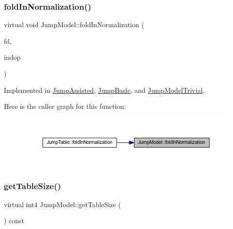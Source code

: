 \subsubsection{\texorpdfstring{foldInNormalization()}{foldInNormalization()}}
{\footnotesize\ttfamily virtual void Jump\+Model\+::fold\+In\+Normalization (\begin{DoxyParamCaption}\item[{\mbox{\hyperlink{class_funcdata}{Funcdata}} $\ast$}]{fd,  }\item[{\mbox{\hyperlink{class_pcode_op}{Pcode\+Op}} $\ast$}]{indop }\end{DoxyParamCaption})\hspace{0.3cm}{\ttfamily [pure virtual]}}



Implemented in \mbox{\hyperlink{class_jump_assisted_aa9732767f921501368f90bd0d1defa1a}{Jump\+Assisted}}, \mbox{\hyperlink{class_jump_basic_a4f3c7e75f6b89afd01e64950959e114d}{Jump\+Basic}}, and \mbox{\hyperlink{class_jump_model_trivial_a942b0f44fb8ff1fc692914cc26894cc1}{Jump\+Model\+Trivial}}.

Here is the caller graph for this function\+:
\nopagebreak
\begin{figure}[H]
\begin{center}
\leavevmode
\includegraphics[width=350pt]{class_jump_model_a8c346de087366515ed90ba1d27012451_icgraph}
\end{center}
\end{figure}
\mbox{\label{class_jump_model_acbc757d5fe05e9e8cb15697ddc73f367}} 
\subsubsection{\texorpdfstring{getTableSize()}{getTableSize()}}
{\footnotesize\ttfamily virtual int4 Jump\+Model\+::get\+Table\+Size (\begin{DoxyParamCaption}\item[{void}]{ }\end{DoxyParamCaption}) const\hspace{0.3cm}{\ttfamily [pure virtual]}}



